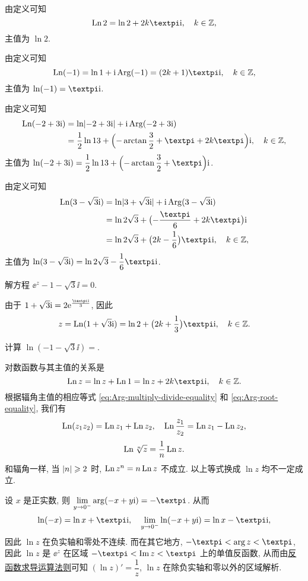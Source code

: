 \begin{solutionenum}
  \item 由定义可知
  \[
    \Ln2=\ln2+2k\cpi\ii,\quad k\in\BZ,
  \]
  主值为 $\ln 2$.
  \item 由定义可知
  \[
    \Ln(-1)=\ln1+\ii\Arg(-1)=(2k+1)\cpi\ii,\quad k\in\BZ,
  \]
  主值为 $\ln(-1)=\cpi\ii$.
  \item 由定义可知
  \begin{align*}
     \Ln(-2+3\ii)&
    =\ln\abs{-2+3\ii}+\ii\Arg(-2+3\ii)\\&
    =\frac 12\ln{13}
      +\Bigl(-\arctan\frac 32+\cpi+2k\cpi\Bigr)\ii,
      \quad k\in\BZ,
  \end{align*}
  主值为 $\ln(-2+3\ii)=\dfrac 12\ln{13}
  +\Bigl(-\arctan\dfrac 32+\cpi\Bigr)\ii$.
  \item 由定义可知
  \begin{align*}
     \Ln(3-\sqrt3\ii)&
    =\ln\abs{3+\sqrt 3\ii}+\ii\Arg(3-\sqrt 3\ii)\\&
    =\ln 2\sqrt 3+\bigl(-\frac\cpi6+2k\cpi\bigr)\ii\\&
    =\ln 2\sqrt 3+\bigl(2k-\frac16\bigr)\cpi\ii,
      \quad k\in\BZ,
  \end{align*}
  主值为 $\ln(3-\sqrt3\ii)=\ln 2\sqrt 3-\dfrac16\cpi\ii$.
\end{solutionenum}

\begin{example}
  解方程 $\ee^z-1-\sqrt 3\ii=0$.
\end{example}

\begin{solution}
  由于 $1+\sqrt 3 \ii=2\ee^{\frac{\cpi\ii}3}$, 因此
  \[
     z
    =\Ln(1+\sqrt 3\ii)
    =\ln 2+\bigl(2k+\frac13\bigr)\cpi\ii,
      \quad k\in\BZ.
  \]
\end{solution}

\begin{exercise}
  计算 $\ln(-1-\sqrt3 \ii)=$\fillblank{}.
\end{exercise}

对数函数与其主值的关系是
\[
  \Ln z=\ln z+\Ln 1=\ln z+2k\cpi\ii,\quad k\in\BZ.
\]
根据辐角主值的相应等式 \ref{eq:Arg-multiply-divide-equality} 和 \ref{eq:Arg-root-equality}, 我们有
\[
  \operatorname{Ln}(z_1 z_2)=\operatorname{Ln} z_1+\operatorname{Ln} z_2,\quad
  \operatorname{Ln}\frac{z_1}{z_2}=\operatorname{Ln} z_1-\operatorname{Ln} z_2,
\]
\[
  \operatorname{Ln} \sqrt[n]z=\frac1n\operatorname{Ln} z.
\]
和辐角一样, 当 $\lvert n\rvert\geqslant 2$ 时, \alert{$\operatorname{Ln} z^n=n\operatorname{Ln} z$ 不成立}.
以上等式换成 $\ln z$ 均不一定成立.

设 $x$ 是正实数, 则 $\liml_{y\ra 0^-}\arg(-x+y\ii)=-\cpi$.
从而
\[
  \ln (-x)=\ln x+\cpi\ii,\quad
  \lim_{y\ra0^-}\ln (-x+y\ii)=\ln x-\cpi\ii,
\]
因此 $\ln z$ 在负实轴和零处不连续.
而在其它地方, $-\cpi<\arg z<\cpi$, 因此 $\ln z$ 是 $\ee^z$ 在区域 $-\cpi<\Im z<\cpi$ 上的单值反函数, 
从而由\hyperref[item:inverse-function-derivative]{反函数求导运算法则}可知 \alert{$(\ln z)'=\dfrac 1z$}, \alert{$\ln z$ 在除负实轴和零以外的区域解析}.


